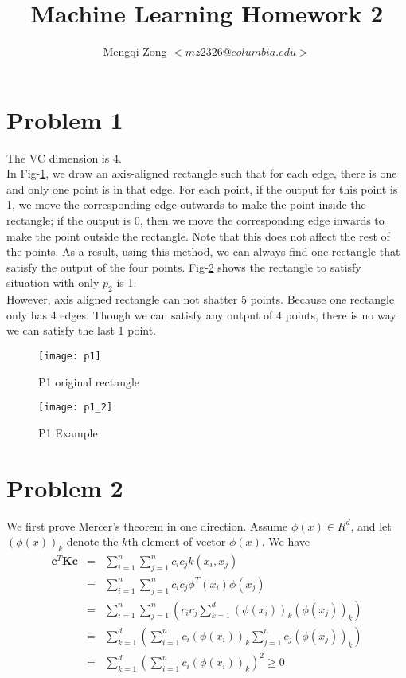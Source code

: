 \documentclass[12pt]{article}
\title{Machine Learning Homework 2}
\author{Mengqi Zong $<mz2326@columbia.edu>$}
\begin{document}
\maketitle

\setlength{\parindent}{0in}

\section*{Problem 1}

The VC dimension is 4. \\

In Fig-\ref{fig:p1}, we draw an axis-aligned rectangle such that for each edge, there is one and only one point is in that edge. For each point, if the output for this point is 1, we move the corresponding edge outwards to make the point inside the rectangle; if the output is 0, then we move the corresponding edge inwards to make the point outside the rectangle. Note that this does not affect the rest of the points. As a result, using this method, we can always find one rectangle that satisfy the output of the four points. Fig-\ref{fig:p1_2} shows the rectangle to satisfy situation with only $p_2$ is 1. \\

However, axis aligned rectangle can not shatter 5 points. Because one rectangle only has 4 edges. Though we can satisfy any output of 4 points, there is no way we can satisfy the last 1 point.

\begin{figure}[ht!]
  \centering
  \texttt{[image: p1]}
  \caption{P1 original rectangle \label{fig:p1}}
\end{figure}

\begin{figure}[ht!]
  \centering
  \texttt{[image: p1\_2]}
  \caption{P1 Example \label{fig:p1_2}}
\end{figure}

\section*{Problem 2}

We first prove Mercer's theorem in one direction. Assume $\phi(x) \in R^d$, and let $(\phi(x))_k$ denote the $k$th element of vector $\phi(x)$. We have
\begin{eqnarray*}
  \textbf{c}^T \textbf{Kc}
  &=& \sum_{i=1}^n \sum_{j=1}^n c_i c_j k(x_i,x_j) \\
  &=& \sum_{i=1}^n \sum_{j=1}^n c_i c_j \phi^T(x_i) \phi(x_j) \\
  &=& \sum_{i=1}^n \sum_{j=1}^n \left(
  c_i c_j \sum_{k=1}^d (\phi(x_i))_k (\phi(x_j))_k 
  \right) \\
  &=& \sum_{k=1}^d \left( \sum_{i=1}^n c_i (\phi(x_i))_k
  \sum_{j=1}^n c_j (\phi(x_j))_k \right) \\
  &=& \sum_{k=1}^d \left( \sum_{i=1}^n c_i (\phi(x_i))_k \right)^2 \ge 0
\end{eqnarray*}
\end{document}

